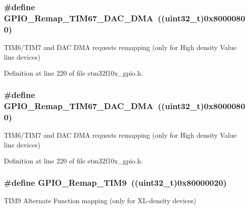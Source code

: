 \subsubsection[{\texorpdfstring{G\+P\+I\+O\+\_\+\+Remap\+\_\+\+T\+I\+M67\+\_\+\+D\+A\+C\+\_\+\+D\+MA}{GPIO_Remap_TIM67_DAC_DMA}}]{\setlength{\rightskip}{0pt plus 5cm}\#define G\+P\+I\+O\+\_\+\+Remap\+\_\+\+T\+I\+M67\+\_\+\+D\+A\+C\+\_\+\+D\+MA~(({\bf uint32\+\_\+t})0x80000800)}\hypertarget{group___g_p_i_o___remap__define_gae69d46a269c2284c8cc6a90742e89b12}{}\label{group___g_p_i_o___remap__define_gae69d46a269c2284c8cc6a90742e89b12}
T\+I\+M6/\+T\+I\+M7 and D\+AC D\+MA requests remapping (only for High density Value line devices) 

Definition at line 220 of file stm32f10x\+\_\+gpio.\+h.

\subsubsection[{\texorpdfstring{G\+P\+I\+O\+\_\+\+Remap\+\_\+\+T\+I\+M67\+\_\+\+D\+A\+C\+\_\+\+D\+MA}{GPIO_Remap_TIM67_DAC_DMA}}]{\setlength{\rightskip}{0pt plus 5cm}\#define G\+P\+I\+O\+\_\+\+Remap\+\_\+\+T\+I\+M67\+\_\+\+D\+A\+C\+\_\+\+D\+MA~(({\bf uint32\+\_\+t})0x80000800)}\hypertarget{group___g_p_i_o___remap__define_gae69d46a269c2284c8cc6a90742e89b12}{}\label{group___g_p_i_o___remap__define_gae69d46a269c2284c8cc6a90742e89b12}
T\+I\+M6/\+T\+I\+M7 and D\+AC D\+MA requests remapping (only for High density Value line devices) 

Definition at line 220 of file stm32f10x\+\_\+gpio.\+h.

\subsubsection[{\texorpdfstring{G\+P\+I\+O\+\_\+\+Remap\+\_\+\+T\+I\+M9}{GPIO_Remap_TIM9}}]{\setlength{\rightskip}{0pt plus 5cm}\#define G\+P\+I\+O\+\_\+\+Remap\+\_\+\+T\+I\+M9~(({\bf uint32\+\_\+t})0x80000020)}\hypertarget{group___g_p_i_o___remap__define_gadfed4d88bc9a4093d16ce64a85b6051a}{}\label{group___g_p_i_o___remap__define_gadfed4d88bc9a4093d16ce64a85b6051a}
T\+I\+M9 Alternate Function mapping (only for X\+L-\/density devices) 

